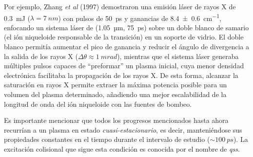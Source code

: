 Por ejemplo, Zhang \emph{et al} (1997)\autocite{Zhang1997} demostraron una emisión láser de rayos X de \qty{0.3}{mJ} ($\lambda = \qty{7}{nm}$) con pulsos de \qty{50}{ps} y ganancias de \qty{8.4 +- 0.6}{cm^{-1}}, enfocando un sistema láser de  (\qty{1.05}{µm}, \qty{75}{ps}) sobre un doble blanco de samario (el ión niqueloide responsable de la transición) en un soporte de vidrio. El doble blanco permitía aumentar el pico de ganancia y reducir el ángulo de divergencia a la salida de los rayos X ($\Delta \theta \approx \qty{1}{mrad}$), mientras que el sistema láser generaba múltiples pulsos capaces de \enquote{preformar} un plasma inicial, cuya menor densidad electrónica facilitaba la propagación de los rayos X. De esta forma, alcanzar la saturación en rayos X permite extraer la máxima potencia posible para un volumen del plasma determinado, añadiendo una mejor escalabilidad de la longitud de onda del ión niqueloide con las fuentes de bombeo.

Es importante mencionar que todos los progresos mencionados hasta ahora recurrían a un plasma en estado \emph{cuasi-estacionario}, es decir, manteniéndose sus propiedades constantes en el tiempo durante el intervalo de estudio ($\sim \qty{100}{ps}$). La excitación colisional que sigue esta condición es conocida por el nombre de \emph{\acrfull{qss}}.






